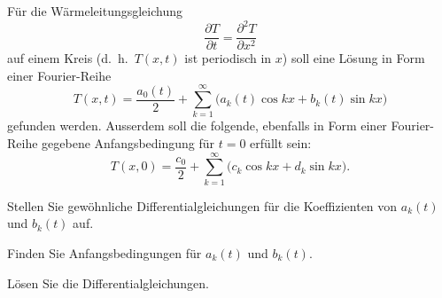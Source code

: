 Für die Wärmeleitungsgleichung
\begin{equation}
\frac{\partial T}{\partial t}=\frac{\partial^2 T}{\partial x^2}
\label{skript:1101:pdgl}
\end{equation}
auf einem Kreis (d.~h.~$T(x,t)$ ist periodisch  in $x$)
soll eine Lösung in Form einer Fourier-Reihe
\begin{equation}
T(x,t)
=
\frac{a_0(t)}{2} + \sum_{k=1}^\infty\bigl(a_k(t)\cos kx + b_k(t)\sin kx\bigr)
\label{skript:1101:ansatz}
\end{equation}
gefunden werden.
Ausserdem soll die folgende, ebenfalls in Form einer Fourier-Reihe
gegebene Anfangsbedingung für $t=0$ erfüllt sein:
\begin{equation}
T(x,0)
=
\frac{c_0}2 + \sum_{k=1}^\infty \bigl(c_k\cos kx+d_k\sin kx\bigr).
\label{skript:1101:anfangsbedingung}
\end{equation}
\begin{teilaufgaben}
\item
Stellen Sie gewöhnliche Differentialgleichungen für die Koeffizienten 
von $a_k(t)$ und $b_k(t)$ auf.
\item
Finden Sie Anfangsbedingungen für $a_k(t)$ und $b_k(t)$.
\item
Lösen Sie die Differentialgleichungen.
\end{teilaufgaben}


